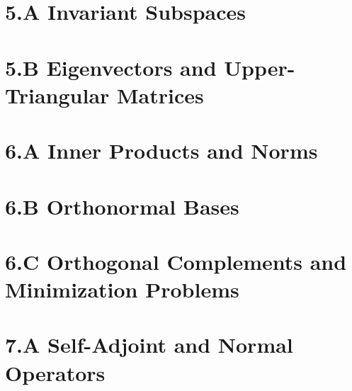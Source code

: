 \documentclass[12pt]{article}
\begin{document}
\pagestyle{fancy}
\fancyhf{}


\newcommand{\per}[1]{{#1}^{\perp}}
\section*{5.A Invariant Subspaces} 
\section*{5.B Eigenvectors and Upper-Triangular Matrices} 
\section*{6.A Inner Products and Norms} 
\section*{6.B Orthonormal Bases} 
\section*{6.C Orthogonal Complements and Minimization Problems} 
\section*{7.A Self-Adjoint and Normal Operators} 
\end{document}
